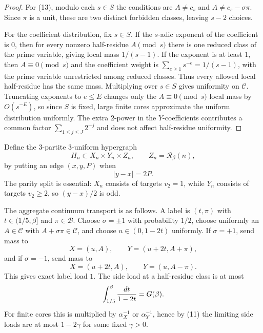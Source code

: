\documentclass[11pt]{article}
\newcommand{\R}{\mathcal R}
\newcommand{\B}{\mathcal B}
\newcommand{\C}{\mathcal C}
\begin{document}
\begin{proof}
For (13), modulo each $s\in S$ the conditions are
$A\ne c_s$ and $A\ne c_s-\sigma\pi$.  Since $\pi$ is a unit, these are two
distinct forbidden classes, leaving $s-2$ choices.

For the coefficient distribution, fix $s\in S$.  If the $s$-adic exponent of the
coefficient is $0$, then for every nonzero half-residue $A\pmod s$ there is one
reduced class of the prime variable, giving local mass $1/(s-1)$.  If the
exponent is at least $1$, then $A\equiv0\pmod s$ and the coefficient weight is
$\sum_{e\ge1}s^{-e}=1/(s-1)$, with the prime variable unrestricted among
reduced classes.  Thus every allowed local half-residue has the same mass.
Multiplying over $s\in S$ gives uniformity on $\C$.  Truncating exponents to
$e\le E$ changes only the $A\equiv0\pmod s$ local mass by $O(s^{-E})$, so since
$S$ is fixed, large finite cores approximate the uniform distribution uniformly.
The extra $2$-power in the $Y$-coefficients contributes a common factor
$\sum_{1\le j\le J}2^{-j}$ and does not affect half-residue uniformity.
\end{proof}

Define the 3-partite 3-uniform hypergraph
\[
  H_n\subset X_n\times Y_n\times Z_n,
  \qquad Z_n=\R_\beta(n),
\]
by putting an edge $(x,y,P)$ when
\[
  |y-x|=2P.                                                 \tag{14}
\]
The parity split is essential: $X_n$ consists of targets $v_2=1$, while $Y_n$
consists of targets $v_2\ge2$, so $(y-x)/2$ is odd.

The aggregate continuum transport is as follows.  A label is $(t,\pi)$ with
$t\in(1/5,\beta]$ and $\pi\in\B$.  Choose $\sigma=\pm1$ with probability $1/2$,
choose uniformly an $A\in\C$ with $A+\sigma\pi\in\C$, and choose
$u\in(0,1-2t)$ uniformly.  If $\sigma=+1$, send mass to
\[
  X=(u,A),\qquad Y=(u+2t,A+\pi),
\]
and if $\sigma=-1$, send mass to
\[
  X=(u+2t,A),\qquad Y=(u,A-\pi).
\]
This gives exact label load $1$.  The side load at a half-residue class is at
most
\[
  \int_{1/5}^{\beta}{dt\over1-2t}=G(\beta).
\]
For finite cores this is multiplied by $\alpha_X^{-1}$ or $\alpha_Y^{-1}$, hence
by (11) the limiting side loads are at most $1-2\gamma$ for some fixed
$\gamma>0$.
\end{document}

